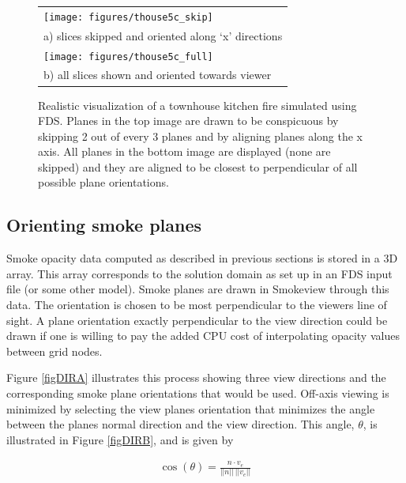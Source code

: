 \begin{figure}[\figoptions]
\begin{center}
\begin{tabular}{l}
\texttt{[image: figures/thouse5c\_skip]}\\
a) slices skipped and oriented along `x' directions\\
\texttt{[image: figures/thouse5c\_full]}\\
b) all slices shown and oriented towards viewer \\
\end{tabular}
\end{center}
\caption[Realistic visualization of a townhouse kitchen fire simulated using FDS.]{Realistic visualization of a townhouse kitchen fire simulated using FDS. Planes in the top image are drawn to be conspicuous by skipping 2 out of every 3 planes and by aligning planes along the x axis. All planes in the bottom image are displayed (none are skipped) and they are aligned to be closest to perpendicular of all possible plane orientations.}
\label{figsmoke3d}%
\end{figure}

%
%

\subsection{Orienting smoke planes}

Smoke opacity data computed as described in previous sections is stored in a 3D array. This array corresponds to the solution domain as set up in an FDS input file (or some other model). Smoke planes are drawn in Smokeview through this data.  The orientation is chosen to be most perpendicular to the viewers line of sight. A plane orientation exactly perpendicular to the view direction could be drawn if one is willing to pay the added CPU cost of interpolating opacity values between grid nodes.

Figure \ref{figDIRA} illustrates this process showing three view directions and the corresponding smoke plane orientations that would be used. Off-axis viewing is minimized by selecting the view planes orientation that minimizes the angle between the planes normal direction and the view direction. This angle, $\theta$, is illustrated in Figure \ref{figDIRB}, and is given by

\begin{eqnarray*}
\cos(\theta)=\frac{n\cdot v_e}{||n||~||v_e||}
\end{eqnarray*}

